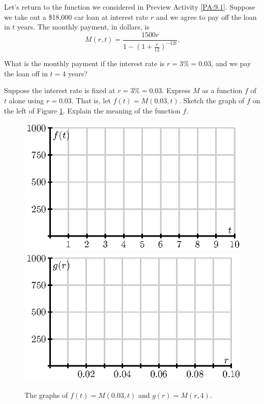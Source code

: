 \begin{pa} \label{PA:10.2} Let's return to the function we considered
  in Preview Activity \ref{PA:9.1}.  Suppose we take out a \$18,000
  car loan at interest rate $r$ and we agree to pay off the loan in
  $t$ years.  The monthly payment, in dollars, is
  $$
  M(r,t) =
  \frac{1500r}{1-\left(1+\frac{r}{12}\right)^{-12t}}.
  $$

  \ba
  \item What is the monthly payment if the interest rate is $r=3\% =
    0.03$, and we pay the loan off in $t=4$ years?

  \item Suppose the interest rate is fixed at $r=3\%=0.03$.  Express $M$ as a function $f$ of $t$ alone using $r=0.03$. That is, let $f(t) = M(0.03, t)$. Sketch the graph of $f$ on the left of
    Figure \ref{F:10.2.preview.1}.  Explain the meaning of the function $f$.

    \begin{figure}[ht]
      \begin{center}
        \includegraphics{figures/fig_10_2_preview_1.eps}
        \hspace*{20pt}
        \includegraphics{figures/fig_10_2_preview_2.eps}
        \caption{The graphs of $f(t)= M(0.03, t)$ and $g(r) = M(r,4)$.}
        \label{F:10.2.preview.1}
      \end{center}
    \end{figure}


\end{pa}
